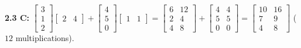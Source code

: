 \documentclass[11pt,a4paper,openany,oneside]{book}
\numberwithin{equation}{chapter}
\begin{document}
\textbf{2.3 C:} $\begin{bmatrix}3\\1\\2\end{bmatrix}\begin{bmatrix}2 & 4\end{bmatrix} + \begin{bmatrix}4\\5\\0\end{bmatrix}\begin{bmatrix}1 & 1\end{bmatrix} = \begin{bmatrix}6 & 12\\2 & 4\\4 & 8\end{bmatrix} + \begin{bmatrix}4 & 4\\5 & 5\\0 & 0\end{bmatrix} = \begin{bmatrix}10 & 16\\7 & 9\\4 & 8\end{bmatrix}$ ($12$ multiplications).
\end{document}
